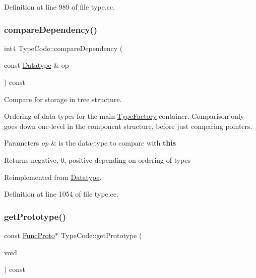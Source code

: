 Definition at line 989 of file type.\+cc.

\mbox{\label{class_type_code_a486209b2c4c2efe517f9b5e6a566592e}} 
\subsubsection{\texorpdfstring{compareDependency()}{compareDependency()}}
{\footnotesize\ttfamily int4 Type\+Code\+::compare\+Dependency (\begin{DoxyParamCaption}\item[{const \mbox{\hyperlink{class_datatype}{Datatype}} \&}]{op }\end{DoxyParamCaption}) const\hspace{0.3cm}{\ttfamily [virtual]}}



Compare for storage in tree structure. 

Ordering of data-\/types for the main \mbox{\hyperlink{class_type_factory}{Type\+Factory}} container. Comparison only goes down one-\/level in the component structure, before just comparing pointers. 
\begin{DoxyParams}{Parameters}
{\em op} & is the data-\/type to compare with {\bfseries{this}} \\
\hline
\end{DoxyParams}
\begin{DoxyReturn}{Returns}
negative, 0, positive depending on ordering of types 
\end{DoxyReturn}


Reimplemented from \mbox{\hyperlink{class_datatype_ab26e4ca2c3091d3c5a34b4fbd7be76ae}{Datatype}}.



Definition at line 1054 of file type.\+cc.

\mbox{\label{class_type_code_a2c6a4552d7ac88c7597f22479f5e11b0}} 
\subsubsection{\texorpdfstring{getPrototype()}{getPrototype()}}
{\footnotesize\ttfamily const \mbox{\hyperlink{class_func_proto}{Func\+Proto}}$\ast$ Type\+Code\+::get\+Prototype (\begin{DoxyParamCaption}\item[{void}]{ }\end{DoxyParamCaption}) const\hspace{0.3cm}{\ttfamily [inline]}}



